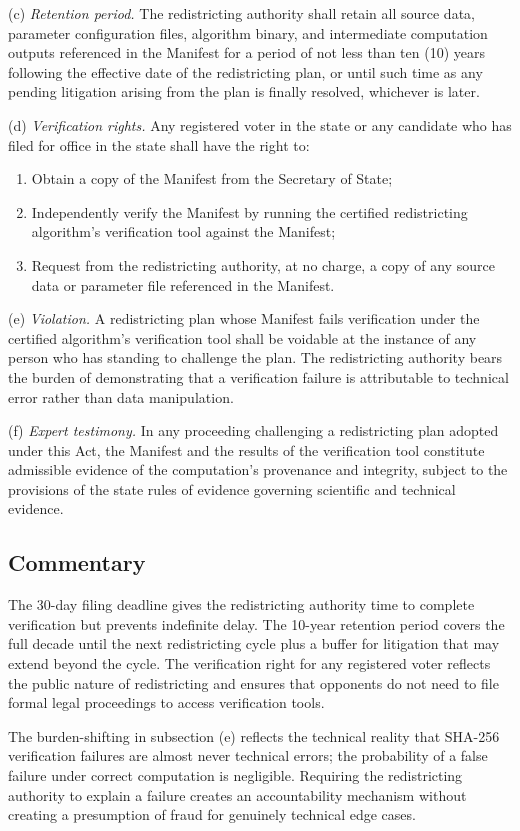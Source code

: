 \medskip
(c) \textit{Retention period.} The redistricting authority shall retain
all source data, parameter configuration files, algorithm binary, and
intermediate computation outputs referenced in the Manifest for a period
of not less than ten (10) years following the effective date of the
redistricting plan, or until such time as any pending litigation arising
from the plan is finally resolved, whichever is later.

\medskip
(d) \textit{Verification rights.} Any registered voter in the state or
any candidate who has filed for office in the state shall have the right
to:
\begin{enumerate}
\item Obtain a copy of the Manifest from the Secretary of State;
\item Independently verify the Manifest by running the certified
  redistricting algorithm's verification tool against the Manifest;
\item Request from the redistricting authority, at no charge, a copy
  of any source data or parameter file referenced in the Manifest.
\end{enumerate}

\medskip
(e) \textit{Violation.} A redistricting plan whose Manifest fails
verification under the certified algorithm's verification tool shall
be voidable at the instance of any person who has standing to challenge
the plan.
The redistricting authority bears the burden of demonstrating that a
verification failure is attributable to technical error rather than
data manipulation.

\medskip
(f) \textit{Expert testimony.} In any proceeding challenging a redistricting
plan adopted under this Act, the Manifest and the results of the
verification tool constitute admissible evidence of the computation's
provenance and integrity, subject to the provisions of the state rules
of evidence governing scientific and technical evidence.

\subsection{Commentary}

The 30-day filing deadline gives the redistricting authority time to
complete verification but prevents indefinite delay.
The 10-year retention period covers the full decade until the next
redistricting cycle plus a buffer for litigation that may extend beyond
the cycle.
The verification right for any registered voter reflects the public
nature of redistricting and ensures that opponents do not need to file
formal legal proceedings to access verification tools.

The burden-shifting in subsection (e) reflects the technical reality that
SHA-256 verification failures are almost never technical errors; the
probability of a false failure under correct computation is negligible.
Requiring the redistricting authority to explain a failure creates an
accountability mechanism without creating a presumption of fraud for
genuinely technical edge cases.
